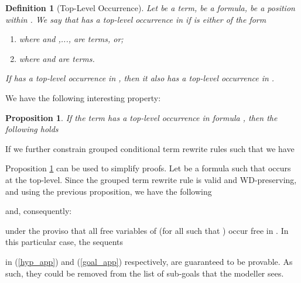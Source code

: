 \documentclass[copyright]{eptcs}
\newtheorem{proposition}[theorem]{Proposition}
\newtheorem{definition}[theorem]{Definition}
\begin{document}
\begin{definition}[Top-Level Occurrence]
Let  be a term,  be a formula,  be a position within . We say that  has a top-level occurrence in  if  is either of the form 
\begin{enumerate}
\item  where  and ,...,  are terms, or; 
\item  where  and  are terms.  
\end{enumerate}
If  has a top-level occurrence in , then it also has a top-level occurrence in .
\end{definition}
We have the following interesting property:
\begin{proposition}\label{toplevel_prop}
If the term  has a top-level occurrence in formula , then the following holds

\end{proposition}
If we further constrain grouped conditional term rewrite rules such that we have

Proposition \ref{toplevel_prop} can be used to simplify proofs. Let  be a formula such that  occurs at the top-level. Since the grouped term rewrite rule is valid and WD-preserving, and using the previous proposition, we have the following

and, consequently:

under the proviso that all free variables of  (for all  such that ) occur free in . In this particular case, the sequents

in (\ref{hyp_app}) and (\ref{goal_app}) respectively, are guaranteed to be provable. As such, they could be removed from the list of sub-goals that the modeller sees.
\end{document}
